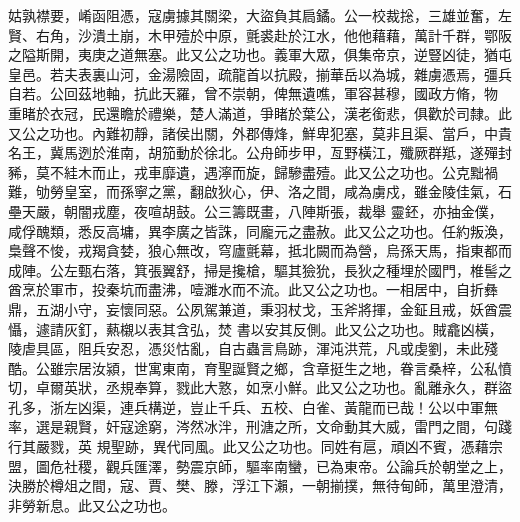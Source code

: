 \begin{pinyinscope}
 姑孰襟要，崤函阻憑，寇虜據其關梁，大盜負其扃鐍。公一校裁捴，三雄並奮，左賢、右角，沙潰土崩，木甲殪於中原，氈裘赴於江水，他他藉藉，萬計千群，鄂阪之隘斯開，夷庚之道無塞。此又公之功也。義軍大眾，俱集帝京，逆豎凶徒，猶屯皇邑。若夫表裏山河，金湯險固，疏龍首以抗殿，揃華岳以為城，雜虜憑焉，彊兵自若。公回茲地軸，抗此天羅，曾不崇朝，俾無遺噍，軍容甚穆，國政方脩，物
 重睹於衣冠，民還瞻於禮樂，楚人滿道，爭睹於葉公，漢老銜悲，俱歡於司隸。此又公之功也。內難初靜，諸侯出關，外郡傳烽，鮮卑犯塞，莫非且渠、當戶，中貴名王，冀馬迾於淮南，胡笳動於徐北。公舟師步甲，亙野橫江，殲厥群羝，遂殫封豨，莫不絓木而止，戎車靡遺，遇濘而旋，歸驂盡殪。此又公之功也。公克黜禍難，劬勞皇室，而孫寧之黨，翻啟狄心，伊、洛之間，咸為虜戍，雖金陵佳氣，石壘天嚴，朝闇戎塵，夜喧胡鼓。公三籌既畫，八陣斯張，裁舉
 靈鉟，亦抽金僕，咸俘醜類，悉反高墉，異李廣之皆誅，同龐元之盡赦。此又公之功也。任約叛渙，梟聲不悛，戎羯貪婪，狼心無改，穹廬氈幕，抵北闕而為營，烏孫天馬，指東都而成陣。公左甄右落，箕張翼舒，掃是攙槍，驅其獫狁，長狄之種埋於國門，椎髻之酋烹於軍市，投秦坑而盡沸，噎濉水而不流。此又公之功也。一相居中，自折彝鼎，五湖小守，妄懷同惡。公夙駕兼道，秉羽杖戈，玉斧將揮，金鉦且戒，妖酋震懾，遽請灰釘，爇櫬以表其含弘，焚
 書以安其反側。此又公之功也。賊龕凶橫，陵虐具區，阻兵安忍，憑災怙亂，自古蟲言鳥跡，渾沌洪荒，凡或虔劉，未此殘酷。公雖宗居汝潁，世寓東南，育聖誕賢之鄉，含章挺生之地，眷言桑梓，公私憤切，卓爾英狀，丞規奉算，戮此大憝，如烹小鮮。此又公之功也。亂離永久，群盜孔多，浙左凶渠，連兵構逆，豈止千兵、五校、白雀、黃龍而已哉！公以中軍無率，選是親賢，奸寇途窮，涔然冰泮，刑溏之所，文命動其大威，雷門之間，句踐行其嚴戮，英
 規聖跡，異代同風。此又公之功也。同姓有扈，頑凶不賓，憑藉宗盟，圖危社稷，觀兵匯澤，勢震京師，驅率南蠻，已為東帝。公論兵於朝堂之上，決勝於樽俎之間，寇、賈、樊、滕，浮江下瀨，一朝揃撲，無待甸師，萬里澄清，非勞新息。此又公之功也。




\end{pinyinscope}
